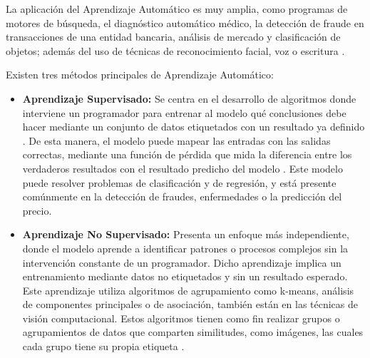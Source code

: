 La aplicación del Aprendizaje Automático es muy amplia, como programas de motores de búsqueda, el diagnóstico automático médico, la detección de fraude en transacciones de una entidad bancaria, análisis de mercado y clasificación de objetos; además del uso de técnicas de reconocimiento facial, voz o escritura \parencite{pr_diaz}.

Existen tres métodos principales de Aprendizaje Automático:
\begin{itemize}
	\item \textbf{Aprendizaje Supervisado:} Se centra en el desarrollo de algoritmos donde interviene un programador para entrenar al modelo qué conclusiones debe hacer mediante un conjunto de datos etiquetados con un resultado ya definido \parencite{gl_oci}.  De esta manera, el modelo puede mapear las entradas con las salidas correctas, mediante una función de pérdida que mida la diferencia entre los verdaderos resultados con el resultado predicho del modelo \parencite{gl_super}. Este modelo puede resolver problemas de clasificación y de regresión, y está presente comúnmente en la detección de fraudes, enfermedades o la predicción del precio. 
	
	\item \textbf{Aprendizaje No Supervisado:} Presenta un enfoque más independiente, donde el modelo aprende a identificar patrones o procesos complejos sin la intervención constante de un programador. Dicho aprendizaje implica un entrenamiento mediante datos no etiquetados y sin un resultado esperado. Este aprendizaje utiliza algoritmos de agrupamiento como k-means, análisis de componentes principales o de asociación, también están en las técnicas de visión computacional. Estos algoritmos tienen como fin realizar grupos o agrupamientos de datos que comparten similitudes, como imágenes, las cuales cada grupo tiene su propia etiqueta \parencite{gl_oci}. 
	

\end{itemize}
